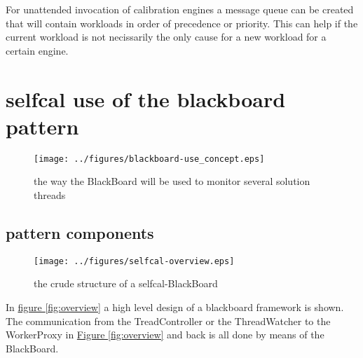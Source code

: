 \documentclass[]{lofar}
\begin{document}
    For unattended invocation of calibration engines a message queue
    can be created that will contain workloads in order of precedence
    or priority. This can help if the current workload is not
    necissarily the only cause for a new workload for a certain
    engine.

  \section{selfcal use of the blackboard pattern}
  \label{sec:selfcal-use-blackboard}
  \begin{figure}
    \texttt{[image: ../figures/blackboard-use\_concept.eps]}
    \hypertarget{fig:blackboard-use}{}
    \caption{the way the BlackBoard will be used to monitor several
    solution threads\label{fig:blackboard-use}}
  \end{figure}

    \subsection{pattern components}
    \label{subsec:pattern-components}

      \begin{figure}
        \texttt{[image: ../figures/selfcal-overview.eps]}
        \hypertarget{fig:overview}{}
        \caption{the crude structure of a selfcal-BlackBoard\label{fig:selfcal-overview}}
      \end{figure}

      In \hyperlink{fig:overview}{figure \ref{fig:overview}} a high
      level design of a blackboard framework is shown. The
      communication from the TreadController or the ThreadWatcher to
      the WorkerProxy in \hyperlink{fig:overview}{Figure
      \ref{fig:overview}} and back is all done by means of the
      BlackBoard.
\end{document}
